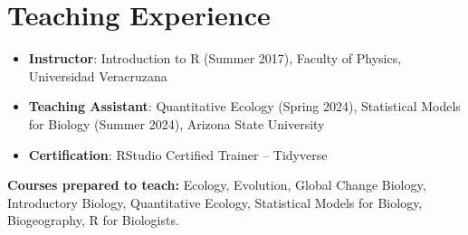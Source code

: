 \documentclass[11pt,a4paper]{article}
\begin{document}
\section*{Teaching Experience}

\begin{itemize}[leftmargin=0pt]
\item \textbf{Instructor}: Introduction to R (Summer 2017), Faculty of Physics, Universidad Veracruzana
\item \textbf{Teaching Assistant}: Quantitative Ecology (Spring 2024), Statistical Models for Biology (Summer 2024), Arizona State University
\item \textbf{Certification}: RStudio Certified Trainer -- Tidyverse
\end{itemize}

\textbf{Courses prepared to teach:} Ecology, Evolution, Global Change Biology, Introductory Biology, Quantitative Ecology, Statistical Models for Biology, Biogeography, R for Biologists.




\end{document}
